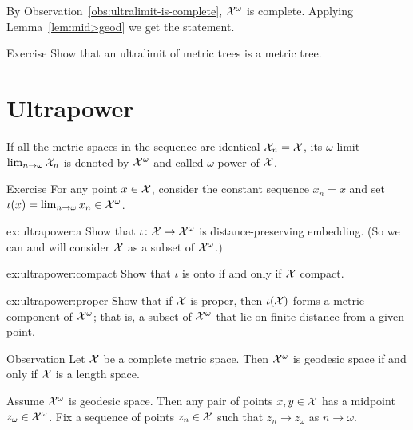 By Observation~\ref{obs:ultralimit-is-complete}, $\mathcal{X}^\omega$ is complete.
Applying Lemma~\ref{lem:mid>geod} we get the statement.
\qeds


\begin{thm}{Exercise}\label{ex:lim(tree)}
Show that an ultralimit of metric trees is a metric tree. 
\end{thm}

\section{Ultrapower}

If all the metric spaces in the sequence are identical $\mathcal{X}_n=\mathcal{X}$, 
its $\omega$-limit 
$\lim_{n\to\omega}\mathcal{X}_n$
is denoted by $\mathcal{X}^\omega$
and called $\omega$-power of $\mathcal{X}$.



\begin{thm}{Exercise}\label{ex:ultrapower}
For any point $x\in \mathcal{X}$, consider the constant sequence $x_n=x$
and set $\iota(x)=\lim_{n\to\omega}x_n\in\mathcal{X}^\omega$.

\begin{subthm}{ex:ultrapower:a}
Show that $\iota\colon\mathcal{X}\to\mathcal{X}^\omega$ is distance-preserving embedding. (So we can and will consider $\mathcal{X}$ as a subset of $\mathcal{X}^\omega$.)
\end{subthm}

\begin{subthm}{ex:ultrapower:compact} 
Show that $\iota$ is onto if and only if $\mathcal{X}$ compact.
\end{subthm}

\begin{subthm}{ex:ultrapower:proper} 
Show that if $\mathcal{X}$ is proper, then $\iota(\mathcal{X})$ forms a metric component of $\mathcal{X}^\omega$; that is, a subset of $\mathcal{X}^\omega$ that lie on finite distance from a given point.
\end{subthm}

\end{thm}

\begin{thm}{Observation}\label{obs:ultrapower-is-geodesic}
Let $\mathcal{X}$ be a complete metric space. 
Then $\mathcal{X}^\omega$ is geodesic space if and only if $\mathcal{X}$ is a length space.
\end{thm}

Assume $\mathcal{X}^\omega$ is geodesic space.
Then any pair of points $x,y\in \mathcal{X}$ has a midpoint $z_\omega\in\mathcal{X}^\omega$.
Fix a sequence of points $z_n\in  \mathcal{X}$ such that $z_n\to z_\omega$ as $n\to \omega$.

